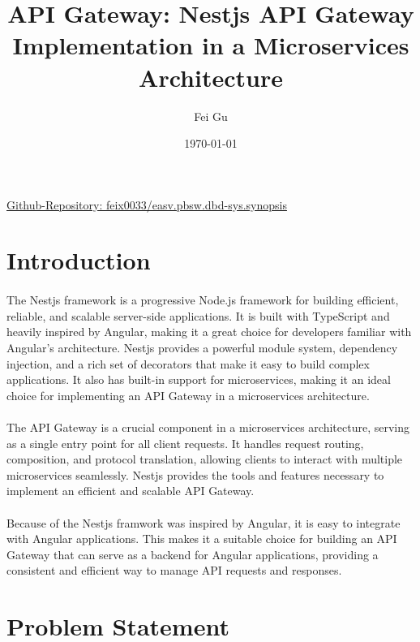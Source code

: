 \documentclass{article}
\title{API Gateway: Nestjs API Gateway Implementation in a Microservices Architecture}
\author{Fei Gu}
\date{\today}
\begin{document}
\maketitle
\href{https://github.com/feix0033/easv.pbsw.dbd-sys.synopsis}{Github-Repository: feix0033/easv.pbsw.dbd-sys.synopsis}

\section{Introduction}
\paragraph{}
The Nestjs framework is a progressive Node.js framework for building efficient, reliable, and scalable server-side applications. It is built with TypeScript and heavily inspired by Angular, making it a great choice for developers familiar with Angular's architecture.
Nestjs provides a powerful module system, dependency injection, and a rich set of decorators that make it easy to build complex applications. It also has built-in support for microservices, making it an ideal choice for implementing an API Gateway in a microservices architecture.

\paragraph{}
The API Gateway is a crucial component in a microservices architecture, serving as a single entry point for all client requests. It handles request routing, composition, and protocol translation, allowing clients to interact with multiple microservices seamlessly. Nestjs provides the tools and features necessary to implement an efficient and scalable API Gateway.

\paragraph{}
Because of the Nestjs framwork was inspired by Angular, it is easy to integrate with Angular applications. This makes it a suitable choice for building an API Gateway that can serve as a backend for Angular applications, providing a consistent and efficient way to manage API requests and responses.
\section{Problem Statement}
\end{document}
